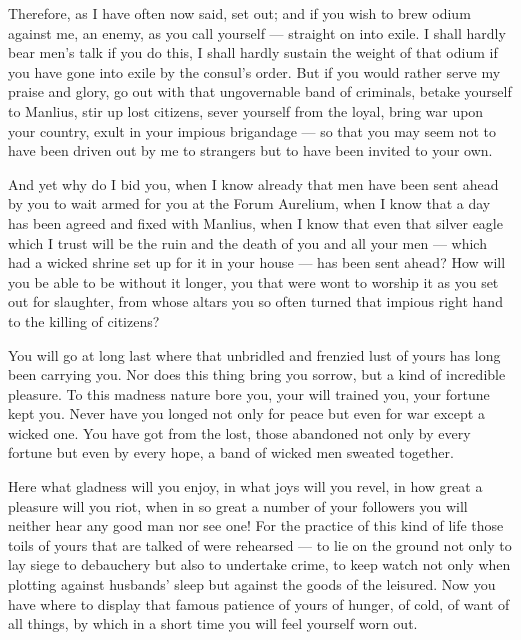  Therefore, as I have often now said, set out; and if you wish to brew odium against me, an enemy, as you call yourself --- straight on into exile. I shall hardly bear men's talk if you do this, I shall hardly sustain the weight of that odium if you have gone into exile by the consul's order. But if you would rather serve my praise and glory, go out with that ungovernable band of criminals, betake yourself to Manlius, stir up lost citizens, sever yourself from the loyal, bring war upon your country, exult in your impious brigandage --- so that you may seem not to have been driven out by me to strangers but to have been invited to your own.

 And yet why do I bid you, when I know already that men have been sent ahead by you to wait armed for you at the Forum Aurelium, when I know that a day has been agreed and fixed with Manlius, when I know that even that silver eagle which I trust will be the ruin and the death of you and all your men --- which had a wicked shrine set up for it in your house --- has been sent ahead? How will you be able to be without it longer, you that were wont to worship it as you set out for slaughter, from whose altars you so often turned that impious right hand to the killing of citizens?

 You will go at long last where that unbridled and frenzied lust of yours has long been carrying you. Nor does this thing bring you sorrow, but a kind of incredible pleasure. To this madness nature bore you, your will trained you, your fortune kept you. Never have you longed not only for peace but even for war except a wicked one. You have got from the lost, those abandoned not only by every fortune but even by every hope, a band of wicked men sweated together.

 Here what gladness will you enjoy, in what joys will you revel, in how great a pleasure will you riot, when in so great a number of your followers you will neither hear any good man nor see one! For the practice of this kind of life those toils of yours that are talked of were rehearsed --- to lie on the ground not only to lay siege to debauchery but also to undertake crime, to keep watch not only when plotting against husbands' sleep but against the goods of the leisured. Now you have where to display that famous patience of yours of hunger, of cold, of want of all things, by which in a short time you will feel yourself worn out.

